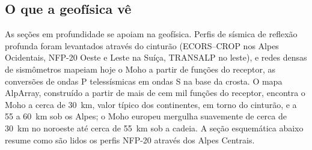 \subsection*{O que a geofísica vê}

As seções em profundidade se apoiam na geofísica. Perfis de sísmica de reflexão profunda foram levantados
através do cinturão (ECORS--CROP nos Alpes Ocidentais, NFP-20 Oeste e Leste na
Suíça, TRANSALP no leste), e redes densas de sismômetros mapeiam hoje o Moho
a partir de funções do receptor, as conversões de ondas P telessísmicas em ondas S na base da
crosta. O mapa AlpArray, construído a partir de mais de cem mil funções do receptor,
encontra o Moho a cerca de \qty{30}{km}, valor típico dos continentes, em torno do cinturão, e a 55 a
\qty{60}{km} sob os Alpes; o Moho europeu mergulha suavemente de cerca de \qty{30}{km} no
noroeste até cerca de \qty{55}{km} sob a cadeia.
A seção esquemática abaixo resume como são lidos os perfis NFP-20 através dos Alpes
Centrais.


